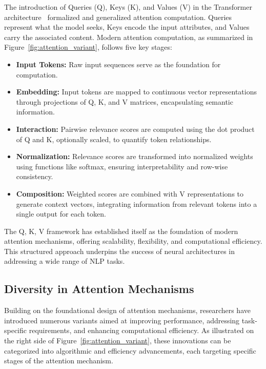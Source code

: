 The introduction of Queries (Q), Keys (K), and Values (V) in the Transformer architecture~\cite{Ashish17AttentionIsAllYouNeed} formalized and generalized attention computation. Queries represent what the model seeks, Keys encode the input attributes, and Values carry the associated content. Modern attention computation, as summarized in Figure~\ref{fig:attention_variant}, follows five key stages:
\begin{itemize}[noitemsep, topsep=0pt]
    \item \textbf{Input Tokens:} Raw input sequences serve as the foundation for computation.
    \item \textbf{Embedding:} Input tokens are mapped to continuous vector representations through projections of Q, K, and V matrices, encapsulating semantic information.
    \item \textbf{Interaction:} Pairwise relevance scores are computed using the dot product of Q and K, optionally scaled, to quantify token relationships.
    \item \textbf{Normalization:} Relevance scores are transformed into normalized weights using functions like softmax, ensuring interpretability and row-wise consistency.
    \item \textbf{Composition:} Weighted scores are combined with V representations to generate context vectors, integrating information from relevant tokens into a single output for each token.
\end{itemize}

The Q, K, V framework has established itself as the foundation of modern attention mechanisms, offering scalability, flexibility, and computational efficiency. This structured approach underpins the success of neural architectures in addressing a wide range of NLP tasks.




\subsection{Diversity in Attention Mechanisms}
 
Building on the foundational design of attention mechanisms, researchers have introduced numerous variants aimed at improving performance, addressing task-specific requirements, and enhancing computational efficiency. As illustrated on the right side of Figure~\ref{fig:attention_variant}, these innovations can be categorized into algorithmic and efficiency advancements, each targeting specific stages of the attention mechanism. 

